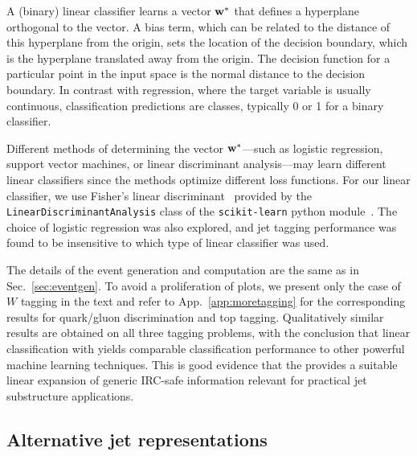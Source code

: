 \documentclass[letterpaper,11pt]{article}
\DeclareRobustCommand{\Sec}[1]{Sec.~\ref{#1}}
\DeclareRobustCommand{\App}[1]{App.~\ref{#1}}
\newcommand{\B}{\text{EFP}\xspace}
\newcommand{\Bs}{\text{EFPs}\xspace}
\begin{document}
A (binary) linear classifier learns a vector ${\bf w}^*$ that defines a hyperplane orthogonal to the vector. 
%
A bias term, which can be related to the distance of this hyperplane from the origin, sets the location of the decision boundary, which is the hyperplane translated away from the origin. 
%
The decision function for a particular point in the input space is the normal distance to the decision boundary. 
%
In contrast with regression, where the target variable is usually continuous, classification predictions are classes, typically 0 or 1 for a binary classifier. 

Different methods of determining the vector ${\bf w}^*$---such as logistic regression, support vector machines, or linear discriminant analysis---may learn different linear classifiers since the methods optimize different loss functions. 
%
For our linear classifier, we use Fisher's linear discriminant~\cite{fisher1936use} provided by the {\tt LinearDiscriminantAnalysis} class of the {\tt scikit-learn} python module~\cite{scikit-learn}.  
%
The choice of logistic regression was also explored, and jet tagging performance was found to be insensitive to which type of linear classifier was used.

The details of the event generation and \B computation are the same as in \Sec{sec:eventgen}. 
%
To avoid a proliferation of plots, we present only the case of $W$ tagging in the text and refer to \App{app:moretagging} for the corresponding results for quark/gluon discrimination and top tagging.
%
Qualitatively similar results are obtained on all three tagging problems, with the conclusion that linear classification with \Bs yields comparable classification performance to other powerful machine learning techniques.
%
This is good evidence that the \Bs provides a suitable linear expansion of generic IRC-safe information relevant for practical jet substructure applications.


\subsection{Alternative jet representations}
\end{document}
